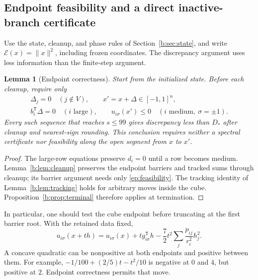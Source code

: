 \documentclass[11pt]{amsart}
\newtheorem{lemma}[theorem]{Lemma}
\theoremstyle{definition}\newtheorem{definition}[theorem]{Definition}
\theoremstyle{remark}\newtheorem{remark}[theorem]{Remark}
\numberwithin{equation}{section}
\newcommand{\T}{\mathsf T}
\begin{document}
\subsection{Endpoint feasibility and a direct inactive-branch certificate}
Use the state, cleanup, and phase rules of
Section~\ref{b:sec:state}, and write $\mathcal E(x)=\|x\|^2$, including
frozen coordinates. The discrepancy argument uses less information than
the finite-step argument.

\begin{lemma}[Endpoint correctness]\label{ep:correctness}
Start from the initialized state. Before each cleanup, require only
\begin{equation}\label{ep:feasibility}
 \begin{gathered}
 \Delta_j=0\quad(j\notin V),\qquad x'=x+\Delta\in[-1,1]^n,\\
 b_i^\T\Delta=0\quad(i\text{ large}),\qquad
 u_{i\sigma}(x')\le0\quad(i\text{ medium},\ \sigma=\pm1).
 \end{gathered}
\end{equation}
Every such sequence that reaches $s\le99$ gives discrepancy less than
$D_*$ after cleanup and nearest-sign rounding. This conclusion requires
neither a spectral certificate nor feasibility along the open segment
from $x$ to $x'$.
\end{lemma}
\begin{proof}
The large-row equations preserve $d_i=0$ until a row becomes medium.
Lemma~\ref{b:lem:cleanup} preserves the endpoint barriers and tracked
sums through cleanup; its barrier argument needs only
\eqref{ep:feasibility}. The tracking identity of
Lemma~\ref{b:lem:tracking} holds for arbitrary moves inside the cube.
Proposition~\ref{b:prop:terminal} therefore applies at termination.
\end{proof}

In particular, one should test the cube endpoint before truncating at
the first barrier root. With the retained data fixed,
\begin{equation}\label{ep:barriercurve}
 u_{i\sigma}(x+th)=u_{i\sigma}(x)+t g_{i\sigma}^\T h
       -\frac72t^2\sum_j\frac{p_{ij}}{r_i^2}h_j^2.
\end{equation}
A concave quadratic can be nonpositive at both endpoints and positive
between them. For example, $-1/100+(2/5)t-t^2/10$ is negative at $0$
and $4$, but positive at $2$. Endpoint correctness permits that move.
\end{document}
